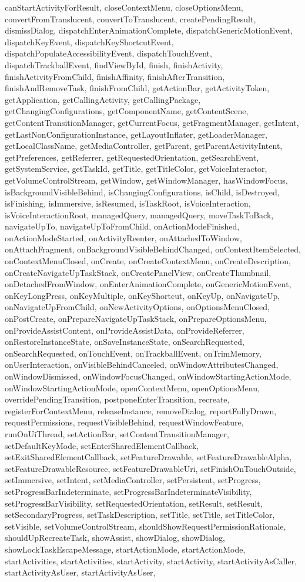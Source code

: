 canStartActivityForResult, closeContextMenu, closeOptionsMenu, convertFromTranslucent, convertToTranslucent, createPendingResult, dismissDialog, dispatchEnterAnimationComplete, dispatchGenericMotionEvent, dispatchKeyEvent, dispatchKeyShortcutEvent, dispatchPopulateAccessibilityEvent, dispatchTouchEvent, dispatchTrackballEvent, findViewById, finish, finishActivity, finishActivityFromChild, finishAffinity, finishAfterTransition, finishAndRemoveTask, finishFromChild, getActionBar, getActivityToken, getApplication, getCallingActivity, getCallingPackage, getChangingConfigurations, getComponentName, getContentScene, getContentTransitionManager, getCurrentFocus, getFragmentManager, getIntent, getLastNonConfigurationInstance, getLayoutInflater, getLoaderManager, getLocalClassName, getMediaController, getParent, getParentActivityIntent, getPreferences, getReferrer, getRequestedOrientation, getSearchEvent, getSystemService, getTaskId, getTitle, getTitleColor, getVoiceInteractor, getVolumeControlStream, getWindow, getWindowManager, hasWindowFocus, isBackgroundVisibleBehind, isChangingConfigurations, isChild, isDestroyed, isFinishing, isImmersive, isResumed, isTaskRoot, isVoiceInteraction, isVoiceInteractionRoot, managedQuery, managedQuery, moveTaskToBack, navigateUpTo, navigateUpToFromChild, onActionModeFinished, onActionModeStarted, onActivityReenter, onAttachedToWindow, onAttachFragment, onBackgroundVisibleBehindChanged, onContextItemSelected, onContextMenuClosed, onCreate, onCreateContextMenu, onCreateDescription, onCreateNavigateUpTaskStack, onCreatePanelView, onCreateThumbnail, onDetachedFromWindow, onEnterAnimationComplete, onGenericMotionEvent, onKeyLongPress, onKeyMultiple, onKeyShortcut, onKeyUp, onNavigateUp, onNavigateUpFromChild, onNewActivityOptions, onOptionsMenuClosed, onPostCreate, onPrepareNavigateUpTaskStack, onPrepareOptionsMenu, onProvideAssistContent, onProvideAssistData, onProvideReferrer, onRestoreInstanceState, onSaveInstanceState, onSearchRequested, onSearchRequested, onTouchEvent, onTrackballEvent, onTrimMemory, onUserInteraction, onVisibleBehindCanceled, onWindowAttributesChanged, onWindowDismissed, onWindowFocusChanged, onWindowStartingActionMode, onWindowStartingActionMode, openContextMenu, openOptionsMenu, overridePendingTransition, postponeEnterTransition, recreate, registerForContextMenu, releaseInstance, removeDialog, reportFullyDrawn, requestPermissions, requestVisibleBehind, requestWindowFeature, runOnUiThread, setActionBar, setContentTransitionManager, setDefaultKeyMode, setEnterSharedElementCallback, setExitSharedElementCallback, setFeatureDrawable, setFeatureDrawableAlpha, setFeatureDrawableResource, setFeatureDrawableUri, setFinishOnTouchOutside, setImmersive, setIntent, setMediaController, setPersistent, setProgress, setProgressBarIndeterminate, setProgressBarIndeterminateVisibility, setProgressBarVisibility, setRequestedOrientation, setResult, setResult, setSecondaryProgress, setTaskDescription, setTitle, setTitle, setTitleColor, setVisible, setVolumeControlStream, shouldShowRequestPermissionRationale, shouldUpRecreateTask, showAssist, showDialog, showDialog, showLockTaskEscapeMessage, startActionMode, startActionMode, startActivities, startActivities, startActivity, startActivity, startActivityAsCaller, startActivityAsUser, startActivityAsUser, 